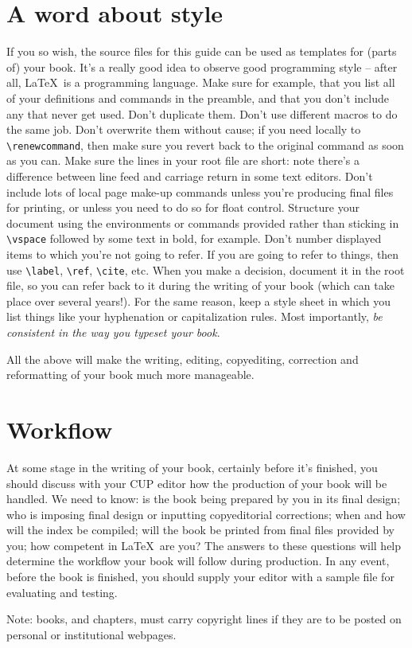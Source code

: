 \section*{A word about style}
If you so wish, the source files for this guide can be used as templates
for (parts of) your book. It's a really good idea
to observe good programming style -- after all,
\LaTeX\ is a programming language. Make sure for example, that
you list all of your definitions and commands in the preamble,
and that you don't include any that never get used. Don't duplicate them.
Don't use different macros to do the same job. Don't overwrite them
without cause; if you need locally to
\verb"\renewcommand", then make sure you revert back to the original command
as soon as you can.  Make sure the lines in
your root file are short: note there's a difference between line feed and carriage return
in some text editors. Don't include lots of local page make-up commands
unless you're producing final files for printing, or unless you
need to do so for float control. Structure your document
using the environments or commands provided rather than sticking in \verb"\vspace" followed
by some text in bold, for example. Don't number displayed items to which you're not
going to refer. If you are going to refer to things, then use \verb"\label",
\verb"\ref", \verb"\cite", etc. When
you make a decision, document it in the root file, so you can refer back to
it during the writing of your
book  (which can take place over several years!).
For the same reason, keep a style sheet in
which you list things like your hyphenation or capitalization rules.
Most importantly, \emph{be consistent in the way you typeset your book}.

All the above will make the writing, editing, copyediting, correction and reformatting of your
book much more manageable.

\section*{Workflow}
At some stage in the writing of your book, certainly before it's finished, you should discuss
with your CUP editor how the production of your book will be handled. We need to know:
 is the book being prepared
by you in its final design; who is imposing final design or inputting copyeditorial corrections;
when and how will the index be compiled; will the book be printed from final files provided by you;
how competent in \LaTeX\ are you? The answers to these questions will help determine the workflow
your book will follow during production. In any event, before the book is finished,
you should supply your editor with a sample file for evaluating and testing.


Note: books, and chapters,  must carry copyright lines if they are to be
posted on personal or institutional webpages.


